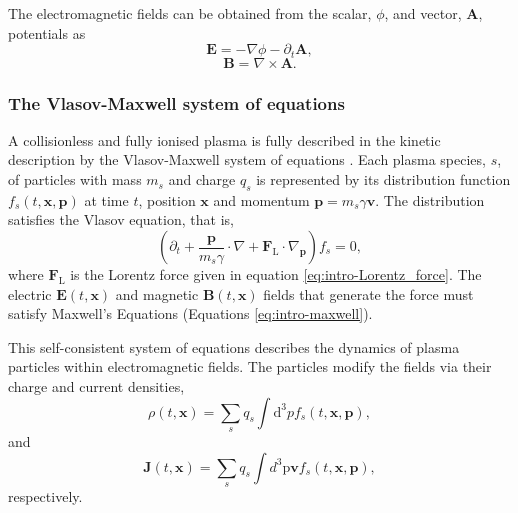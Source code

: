 The electromagnetic fields can be obtained from the scalar, $\phi$, and vector, $\mathbf{A}$, potentials as  \cite{steaneRelativityMadeRelatively2012}
\begin{equation}
	\mathbf{E} = -\nabla \phi - \partial_t \mathbf{A},
\end{equation}
\begin{equation}
	\mathbf{B} = \nabla \times \mathbf{A}.
\end{equation}

\subsubsection{The Vlasov-Maxwell system of equations}\label{sec:ch1-vlasov}
A collisionless and fully ionised plasma is fully described in the kinetic description by the Vlasov-Maxwell system of equations \cite{derouillatSmileiCollaborativeOpensource2018}. Each plasma species, $s$, of particles with mass $m_s$ and charge $q_s$ is represented by its distribution function $f_s(t,\mathbf{x},\mathbf{p})$ at time $t$, position $\mathbf{x}$ and momentum $\mathbf{p} = m_s \gamma \mathbf{v}$. The distribution satisfies the Vlasov equation, that is,
\begin{equation}\label{eq:intro-vlasov}
	(\partial_t + \frac{\mathbf{p}}{m_s\gamma} \cdot \nabla + \mathbf{F}_\mathrm{L} \cdot \nabla_\mathbf{p})f_s = 0,
\end{equation}
where $\mathbf{F}_\mathrm{L}$ is the Lorentz force given in equation \ref{eq:intro-Lorentz_force}. The electric $\mathbf{E}(t,\mathbf{x})$ and magnetic $\mathbf{B}(t,\mathbf{x})$ fields that generate the force must satisfy Maxwell's Equations (Equations \ref{eq:intro-maxwell}).

This self-consistent system of equations describes the dynamics of plasma particles within electromagnetic fields. The particles modify the fields via their charge and current densities,
\begin{equation}\label{eq:intro-rho}
	\rho(t,\mathbf{x}) = \sum_s q_s \int \mathrm{d}^3pf_s(t,\mathbf{x},\mathbf{p}),
\end{equation}
and 
\begin{equation}\label{eq:intro-J}
	\mathbf{J}(t,\mathbf{x}) = \sum_s q_s \int d^3\mathrm{p}\mathbf{v}f_s(t,\mathbf{x},\mathbf{p}),
\end{equation}
respectively.

